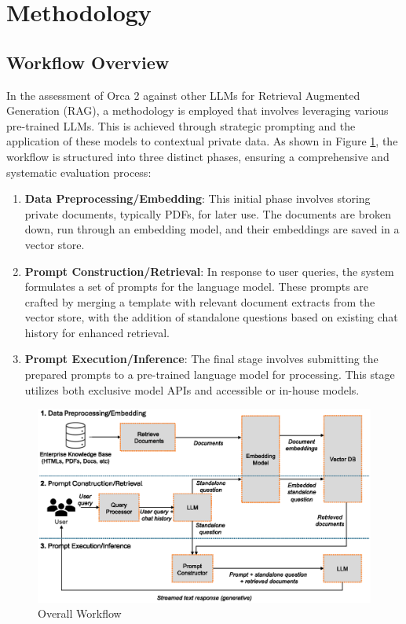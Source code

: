 \documentclass[runningheads]{llncs}
\begin{document}
\section{Methodology}
\label{sec:Method}
\subsection{Workflow Overview}

In the assessment of Orca 2 against other LLMs for Retrieval Augmented Generation (RAG), a methodology is employed that involves leveraging various pre-trained LLMs. This is achieved through strategic prompting and the application of these models to contextual private data. As shown in Figure \ref{fig:rag}, the workflow is structured into three distinct phases, ensuring a comprehensive and systematic evaluation process:

\begin{enumerate}
    \item \textbf{Data Preprocessing/Embedding}: This initial phase involves storing private documents, typically PDFs, for later use. The documents are broken down, run through an embedding model, and their embeddings are saved in a vector store.

    \item \textbf{Prompt Construction/Retrieval}: In response to user queries, the system formulates a set of prompts for the language model. These prompts are crafted by merging a template with relevant document extracts from the vector store, with the addition of standalone questions based on existing chat history for enhanced retrieval.

    \item \textbf{Prompt Execution/Inference}: The final stage involves submitting the prepared prompts to a pre-trained language model for processing. This stage utilizes both exclusive model APIs and accessible or in-house models.
\end{enumerate}

\begin{figure}
    \centering
    \includegraphics[width=1\linewidth]{figures/RAG.eps}
    \caption{Overall Workflow}
    \label{fig:rag}
\end{figure}
\end{document}
